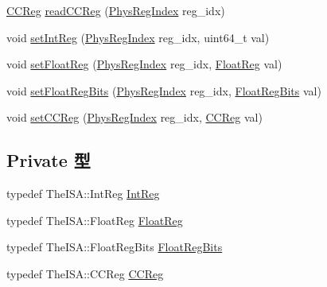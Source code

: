 \begin{DoxyCompactItemize}
\item 
\hyperlink{classPhysRegFile_a0c9de550a32808e6a25b54b6c791d5ab}{CCReg} \hyperlink{classPhysRegFile_a4d6b1a5b45df9a45599d6daf3ea828c1}{readCCReg} (\hyperlink{o3_2comm_8hh_a5ec29599c4bc29a3054c451674969e7b}{PhysRegIndex} reg\_\-idx)
\item 
void \hyperlink{classPhysRegFile_a4c51910e7542c198251e8d014077e9c6}{setIntReg} (\hyperlink{o3_2comm_8hh_a5ec29599c4bc29a3054c451674969e7b}{PhysRegIndex} reg\_\-idx, uint64\_\-t val)
\item 
void \hyperlink{classPhysRegFile_a8aeacafd7db9859a055d4ac5657e6bb7}{setFloatReg} (\hyperlink{o3_2comm_8hh_a5ec29599c4bc29a3054c451674969e7b}{PhysRegIndex} reg\_\-idx, \hyperlink{classPhysRegFile_a75484259f1855aabc8d74c6eb1cfe186}{FloatReg} val)
\item 
void \hyperlink{classPhysRegFile_a394e971ff5d17b49dee93063772f87ce}{setFloatRegBits} (\hyperlink{o3_2comm_8hh_a5ec29599c4bc29a3054c451674969e7b}{PhysRegIndex} reg\_\-idx, \hyperlink{classPhysRegFile_aab5eeae86499f9bfe15ef79360eccc64}{FloatRegBits} val)
\item 
void \hyperlink{classPhysRegFile_a69574b9ed272ea564594bcb8986c6b1d}{setCCReg} (\hyperlink{o3_2comm_8hh_a5ec29599c4bc29a3054c451674969e7b}{PhysRegIndex} reg\_\-idx, \hyperlink{classPhysRegFile_a0c9de550a32808e6a25b54b6c791d5ab}{CCReg} val)
\end{DoxyCompactItemize}
\subsection*{Private 型}
\begin{DoxyCompactItemize}
\item 
typedef TheISA::IntReg \hyperlink{classPhysRegFile_a1355cb78d031430d4d70eb5080267604}{IntReg}
\item 
typedef TheISA::FloatReg \hyperlink{classPhysRegFile_a75484259f1855aabc8d74c6eb1cfe186}{FloatReg}
\item 
typedef TheISA::FloatRegBits \hyperlink{classPhysRegFile_aab5eeae86499f9bfe15ef79360eccc64}{FloatRegBits}
\item 
typedef TheISA::CCReg \hyperlink{classPhysRegFile_a0c9de550a32808e6a25b54b6c791d5ab}{CCReg}
\end{DoxyCompactItemize}
